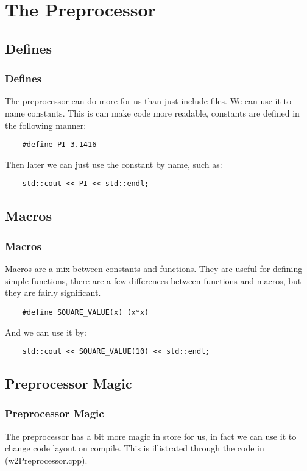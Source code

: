 \documentclass{beamer}
\begin{document}
\section{The Preprocessor}

\subsection{Defines}

\begin{frame}[fragile]
	\frametitle{Defines}
	The preprocessor can do more for us than just include files. We can use it to name constants.
	This is can make code more readable, constants are defined in the following manner:
	\begin{lstlisting}
	#define PI 3.1416
	\end{lstlisting}
	Then later we can just use the constant by name, such as:
	\begin{lstlisting}
	std::cout << PI << std::endl;
	\end{lstlisting}
\end{frame}

\subsection{Macros}

\begin{frame}[fragile]
	\frametitle{Macros}
	Macros are a mix between constants and functions. They are useful for defining simple functions,
	there are a few differences between functions and macros, but they are fairly significant.
	\begin{lstlisting}
	#define SQUARE_VALUE(x) (x*x)
	\end{lstlisting}
	And we can use it by:
	\begin{lstlisting}
	std::cout << SQUARE_VALUE(10) << std::endl;
	\end{lstlisting}
\end{frame}

\subsection{Preprocessor Magic}

\begin{frame}
	\frametitle{Preprocessor Magic}
	The preprocessor has a bit more magic in store for us, in fact we can use it to change code layout
	on compile. This is illistrated through the code in (w2Preprocessor.cpp).
\end{frame}
\end{document}
